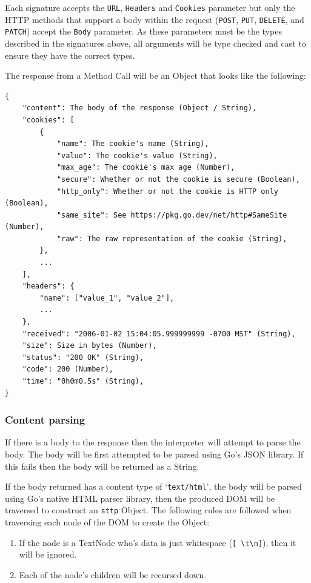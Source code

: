 \documentclass[]{full}
\theoremstyle{definition}
\begin{document}
Each signature accepts the \verb|URL|, \verb|Headers| and \verb|Cookies| parameter but only the HTTP methods that support a body within the request (\verb|POST|, \verb|PUT|, \verb|DELETE|, and \verb|PATCH|) accept the \verb|Body| parameter. As these parameters must be the types described in the signatures above, all arguments will be type checked and cast to ensure they have the correct types.

The response from a Method Call will be an Object that looks like the following:

\begin{verbatim}
{
    "content": The body of the response (Object / String),
    "cookies": [
        {
            "name": The cookie's name (String),
            "value": The cookie's value (String),
            "max_age": The cookie's max age (Number),
            "secure": Whether or not the cookie is secure (Boolean),
            "http_only": Whether or not the cookie is HTTP only (Boolean),
            "same_site": See https://pkg.go.dev/net/http#SameSite (Number),
            "raw": The raw representation of the cookie (String),
        },
        ...
    ],
    "headers": {
        "name": ["value_1", "value_2"],
        ...
    },
    "received": "2006-01-02 15:04:05.999999999 -0700 MST" (String),
    "size": Size in bytes (Number),
    "status": "200 OK" (String),
    "code": 200 (Number),
    "time": "0h0m0.5s" (String),
}
\end{verbatim}

\subsubsection{Content parsing}

If there is a body to the response then the interpreter will attempt to parse the body. The body will be first attempted to be parsed using Go's JSON library. If this fails then the body will be returned as a String.

If the body returned has a content type of `\verb|text/html|', the body will be parsed using Go's native HTML parser library, then the produced DOM will be traversed to construct an \verb|sttp| Object. The following rules are followed when traversing each node of the DOM to create the Object:

\begin{enumerate}
    \item If the node is a TextNode who's data is just whitespace (\verb|[ \t\n]|), then it will be ignored.
    \item Each of the node's children will be recursed down.
\end{enumerate}
\end{document}

